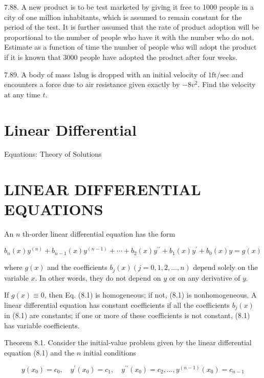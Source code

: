 \documentclass[10pt]{article}
\begin{document}
7.88. A new product is to be test marketed by giving it free to 1000 people in a city of one million inhabitants, which is assumed to remain constant for the period of the test. It is further assumed that the rate of product adoption will be proportional to the number of people who have it with the number who do not. Estimate as a function of time the number of people who will adopt the product if it is known that 3000 people have adopted the product after four weeks.

7.89. A body of mass $1 \mathrm{slug}$ is dropped with an initial velocity of $1 \mathrm{ft} / \mathrm{sec}$ and encounters a force due to air resistance given exactly by $-8 v^{2}$. Find the velocity at any time $t$.

\section*{Linear Differential}
 Equations: Theory of Solutions\section*{LINEAR DIFFERENTIAL EQUATIONS}
An $n$ th-order linear differential equation has the form


\begin{equation*}
b_{n}(x) y^{(n)}+b_{n-1}(x) y^{(n-1)}+\cdots+b_{2}(x) y^{\prime \prime}+b_{1}(x) y^{\prime}+b_{0}(x) y=g(x) \tag{8.1}
\end{equation*}


where $g(x)$ and the coefficients $b_{j}(x)(j=0,1,2, \ldots, n)$ depend solely on the variable $x$. In other words, they do not depend on $y$ or on any derivative of $y$.

If $g(x) \equiv 0$, then Eq. (8.1) is homogeneous; if not, (8.1) is nonhomogeneous. A linear differential equation has constant coefficients if all the coefficients $b_{j}(x)$ in (8.1) are constants; if one or more of these coefficients is not constant, (8.1) has variable coefficients.

Theorem 8.1. Consider the initial-value problem given by the linear differential equation (8.1) and the $n$ initial conditions


\begin{equation*}
y\left(x_{0}\right)=c_{0}, \quad y^{\prime}\left(x_{0}\right)=c_{1}, \quad y^{\prime \prime}\left(x_{0}\right)=c_{2}, \ldots, y^{(n-1)}\left(x_{0}\right)=c_{n-1} \tag{8.2}
\end{equation*}
\end{document}
